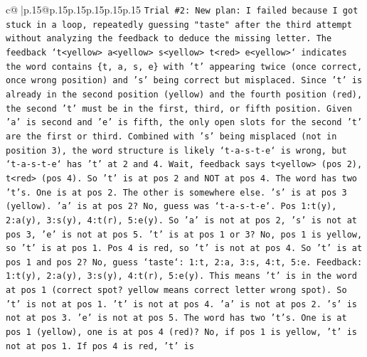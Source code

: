 \documentclass{article}
\begin{document}
{\begin{supertabular}{c@{$\;$}|p{.15\linewidth}@{}p{.15\linewidth}p{.15\linewidth}p{.15\linewidth}p{.15\linewidth}p{.15\linewidth}}
{{{\texttt{Trial \#2: New plan: I failed because I got stuck in a loop, repeatedly guessing "taste" after the third attempt without analyzing the feedback to deduce the missing letter. The feedback `t<yellow> a<yellow> s<yellow> t<red> e<yellow>` indicates the word contains \{t, a, s, e\} with 't' appearing twice (once correct, once wrong position) and 's' being correct but misplaced. Since 't' is already in the second position (yellow) and the fourth position (red), the second 't' must be in the first, third, or fifth position. Given 'a' is second and 'e' is fifth, the only open slots for the second 't' are the first or third. Combined with 's' being misplaced (not in position 3), the word structure is likely `t{-}a{-}s{-}t{-}e` is wrong, but `t{-}a{-}s{-}t{-}e` has 't' at 2 and 4. Wait, feedback says t<yellow> (pos 2), t<red> (pos 4). So 't' is at pos 2 and NOT at pos 4. The word has two 't's. One is at pos 2. The other is somewhere else. 's' is at pos 3 (yellow). 'a' is at pos 2? No, guess was `t{-}a{-}s{-}t{-}e`. Pos 1:t(y), 2:a(y), 3:s(y), 4:t(r), 5:e(y). So 'a' is not at pos 2, 's' is not at pos 3, 'e' is not at pos 5. 't' is at pos 1 or 3? No, pos 1 is yellow, so 't' is at pos 1. Pos 4 is red, so 't' is not at pos 4. So 't' is at pos 1 and pos 2? No, guess `taste`: 1:t, 2:a, 3:s, 4:t, 5:e. Feedback: 1:t(y), 2:a(y), 3:s(y), 4:t(r), 5:e(y). This means 't' is in the word at pos 1 (correct spot? yellow means correct letter wrong spot). So 't' is not at pos 1. 't' is not at pos 4. 'a' is not at pos 2. 's' is not at pos 3. 'e' is not at pos 5. The word has two 't's. One is at pos 1 (yellow), one is at pos 4 (red)? No, if pos 1 is yellow, 't' is not at pos 1. If pos 4 is red, 't' is} \\
\\ 
}}}
\end{supertabular}}
\end{document}
